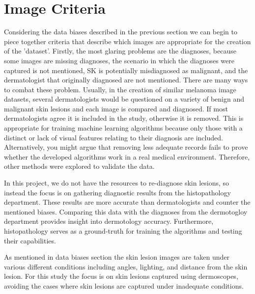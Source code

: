 \section{Image Criteria}
Considering the data biases described in the previous section we can begin to piece together criteria that describe which images are appropriate for the creation of the 'dataset'. Firstly, the most glaring problems are the diagnoses, because some images are missing diagnoses, the scenario in which the diagnoses were captured is not mentioned, SK is potentially misdiagnosed as malignant, and the dermatologist that originally diagnosed are not mentioned. There are many ways to combat these problem. Usually, in the creation of similar melanoma image datasets, several dermatologists would be questioned on a variety of benign and malignant skin lesions and each image is compared and diagnosed. If most dermatologists agree it is included in the study, otherwise it is removed\cite{}. This is appropriate for training machine learning algorithms because only those with a distinct or lack of visual features relating to their diagnosis are included. Alternatively, you might argue that removing less adequate records fails to prove whether the developed algorithms work in a real medical environment. Therefore, other methods were explored to validate the data.

In this project, we do not have the resources to re-diagnose skin lesions, so instead the focus is on gathering diagnostic results from the histopathology department. These results are more accurate than dermatologists and counter the mentioned biases\cite{}. Comparing this data with the diagnoses from the dermotogloy department provides insight into dermotology accuracy. Furthermore, histopathology serves as a ground-truth for training the algorithms and testing their capabilities.

As mentioned in data biases section the skin lesion images are taken under various different conditions including angles, lighting, and distance from the skin lesion. For this study the focus is on skin lesions captured using dermoscopes, avoiding the cases where skin lesions are captured under inadequate conditions.
